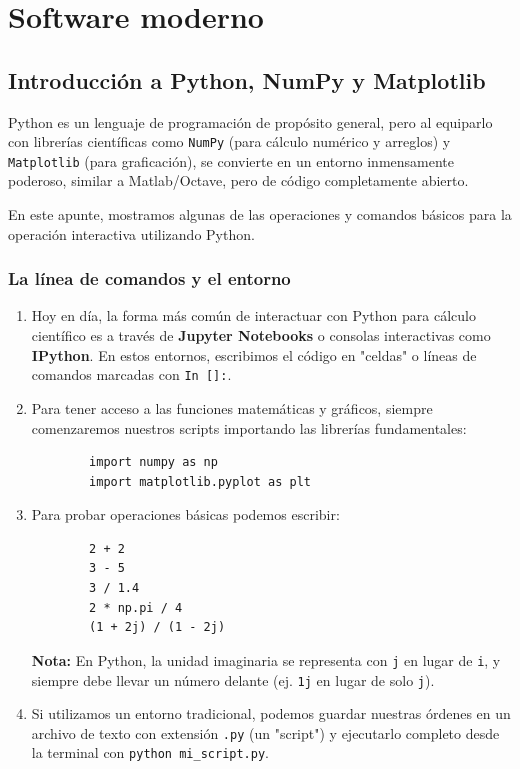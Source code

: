 \documentclass[11pt,a4paper,openany]{book}
\begin{document}
\chapter{Software moderno}

\section{Introducción a Python, NumPy y Matplotlib}

Python es un lenguaje de programación de propósito general, pero al equiparlo con librerías científicas como \texttt{NumPy} (para cálculo numérico y arreglos) y \texttt{Matplotlib} (para graficación), se convierte en un entorno inmensamente poderoso, similar a Matlab/Octave, pero de código completamente abierto.

En este apunte, mostramos algunas de las operaciones y comandos básicos para la operación interactiva utilizando Python.

\subsection{La línea de comandos y el entorno}

\begin{enumerate}
	
	\item Hoy en día, la forma más común de interactuar con Python para cálculo científico es a través de \textbf{Jupyter Notebooks} o consolas interactivas como \textbf{IPython}. En estos entornos, escribimos el código en "celdas" o líneas de comandos marcadas con \verb-In []:-.
	
	\item Para tener acceso a las funciones matemáticas y gráficos, siempre comenzaremos nuestros scripts importando las librerías fundamentales:
	\begin{verbatim}
		import numpy as np
		import matplotlib.pyplot as plt
	\end{verbatim}
	
	\item Para probar operaciones básicas podemos escribir:
	\begin{verbatim}
		2 + 2
		3 - 5
		3 / 1.4
		2 * np.pi / 4
		(1 + 2j) / (1 - 2j)
	\end{verbatim}
	\textbf{Nota:} En Python, la unidad imaginaria se representa con \texttt{j} en lugar de \texttt{i}, y siempre debe llevar un número delante (ej. \texttt{1j} en lugar de solo \texttt{j}).
	
	\item Si utilizamos un entorno tradicional, podemos guardar nuestras órdenes en un archivo de texto con extensión \texttt{.py} (un "script") y ejecutarlo completo desde la terminal con \texttt{python mi\_script.py}.
\end{enumerate}
\end{document}
